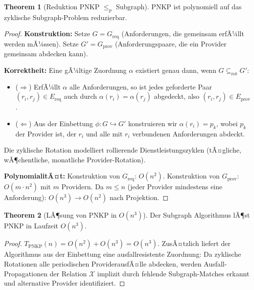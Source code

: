 ﻿\documentclass[a4paper,12pt]{article}
\theoremstyle{definition}
\newtheorem{theorem}{Theorem}[section]
\begin{document}
\begin{theorem}[Reduktion PNKP $\leq_p$ Subgraph]
\label{thm:pnkp-red}
PNKP ist polynomiell auf das zyklische Subgraph-Problem reduzierbar.
\end{theorem}

\begin{proof}
\textbf{Konstruktion:}
Setze $G = G_{\mathrm{req}}$ (Anforderungen, die gemeinsam erfÃ¼llt werden mÃ¼ssen).
Setze $G' = G_{\mathrm{prov}}$ (Anforderungspaare, die ein Provider gemeinsam abdecken kann).

\textbf{Korrektheit:}
Eine gÃ¼ltige Zuordnung $\alpha$ existiert genau dann, wenn $G \subseteq_{\mathrm{rot}} G'$:
\begin{itemize}
    \item ($\Rightarrow$) ErfÃ¼llt $\alpha$ alle Anforderungen, so ist jedes geforderte
          Paar $(r_i, r_j) \in E_{\mathrm{req}}$ auch durch $\alpha(r_i) = \alpha(r_j)$
          abgedeckt, also $(r_i, r_j) \in E_{\mathrm{prov}}$.
    \item ($\Leftarrow$) Aus der Einbettung $\phi: G \hookrightarrow G'$ konstruieren wir
          $\alpha(r_i) = p_k$, wobei $p_k$ der Provider ist, der $r_i$ und alle mit $r_i$
          verbundenen Anforderungen abdeckt.
\end{itemize}
Die zyklische Rotation modelliert rollierende Dienstleistungszyklen
(tÃ¤gliche, wÃ¶chentliche, monatliche Provider-Rotation).

\textbf{PolynomialitÃ¤t:}
Konstruktion von $G_{\mathrm{req}}$: $O(n^2)$.
Konstruktion von $G_{\mathrm{prov}}$: $O(m \cdot n^2)$ mit $m$ Providern.
Da $m \leq n$ (jeder Provider mindestens eine Anforderung): $O(n^3) \to O(n^2)$
nach Projektion.
\end{proof}

\begin{theorem}[LÃ¶sung von PNKP in $O(n^3)$]
\label{thm:pnkp-sol}
Der Subgraph Algorithmus lÃ¶st PNKP in Laufzeit $O(n^3)$.
\end{theorem}

\begin{proof}
$T_{\mathrm{PNKP}}(n) = O(n^2) + O(n^3) = O(n^3)$.
ZusÃ¤tzlich liefert der Algorithmus aus der Einbettung eine ausfallresistente Zuordnung:
Da zyklische Rotationen alle periodischen ProviderausfÃ¤lle abdecken,
werden Ausfall-Propagationen der Relation $\mathcal{X}$ implizit durch fehlende
Subgraph-Matches erkannt und alternative Provider identifiziert.
\end{proof}
\end{document}
